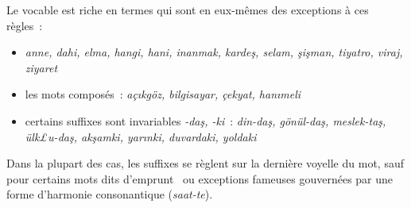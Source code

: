 \documentclass{cours}
\newcommand{\ch}{\c{s}}
\begin{document}
Le vocable est riche en termes qui sont en eux-mêmes des exceptions à ces règles~:
\begin{itemize}
    \item \textsl{anne, dahi, elma, hangi, hani, inanmak, karde\ch, selam, \ch i\ch man, tiyatro, viraj, ziyaret}
    \item les mots composés~: \textsl{aç\i kgöz, bilgisayar, çekyat, han\i meli}
    \item certains suffixes sont invariables {\sl -da\ch, -ki}~: \textsl{din-da\ch, gönül-da\ch, meslek-ta\ch, ülk£u-da\ch, ak\ch amki, yar\i nki, duvardaki, yoldaki}
\end{itemize}
Dans la plupart des cas, les suffixes se règlent sur la dernière voyelle du mot, sauf pour certains mots dits \og d'emprunt \fg\ ou exceptions fameuses gouvernées par une forme d'harmonie consonantique ({\sl saat-te}).
\end{document}
